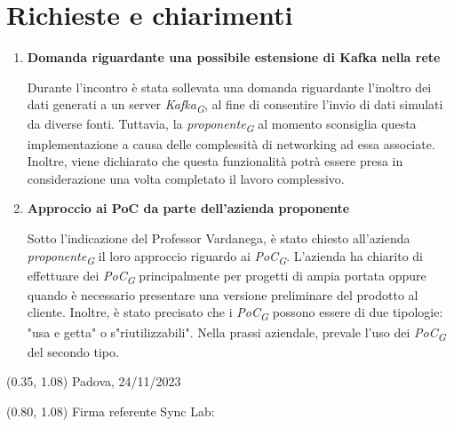 \documentclass{article}
\begin{document}
\section{Richieste e chiarimenti}
\begin{enumerate}
    \item \textbf{Domanda riguardante una possibile estensione di Kafka nella rete}
    
    Durante l'incontro è stata sollevata una domanda riguardante l'inoltro dei dati generati a un server \textit{Kafka}\textsubscript{\textit{G}}, al fine di consentire l'invio di dati simulati da diverse fonti. Tuttavia, la \textit{proponente}\textsubscript{\textit{G}} al momento sconsiglia questa implementazione a causa delle complessità di networking ad essa associate.  
    Inoltre, viene dichiarato che questa funzionalità potrà essere presa in considerazione una volta completato il lavoro complessivo. 

    \item \textbf{Approccio ai PoC da parte dell'azienda proponente}
    
    Sotto l'indicazione del Professor Vardanega, è stato chiesto all’azienda \textit{proponente}\textsubscript{\textit{G}} il loro approccio riguardo ai \textit{PoC}\textsubscript{\textit{G}}. L'azienda ha chiarito di effettuare dei \textit{PoC}\textsubscript{\textit{G}} principalmente per progetti di ampia portata oppure quando è necessario presentare una versione preliminare del prodotto al cliente. Inoltre, è stato precisato che i \textit{PoC}\textsubscript{\textit{G}} possono essere di due tipologie: "usa e getta" o s"riutilizzabili". Nella prassi aziendale, prevale l'uso dei \textit{PoC}\textsubscript{\textit{G}} del secondo tipo.  

\end{enumerate}
    
    
    
\begin{textblock*}{\textwidth}(0.35\textwidth, 1.08\textheight)
    Padova, 24/11/2023
\end{textblock*}

\begin{textblock*}{\textwidth}(0.80\textwidth, 1.08\textheight)
        Firma referente Sync Lab:
\end{textblock*}
\end{document}
